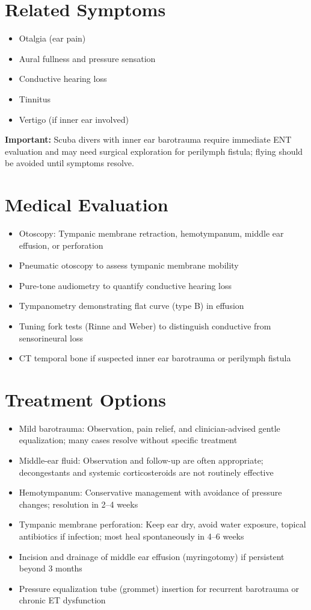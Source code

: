 \section*{Related Symptoms}
\begin{itemize}
  \item Otalgia (ear pain)
  \item Aural fullness and pressure sensation
  \item Conductive hearing loss
  \item Tinnitus
  \item Vertigo (if inner ear involved)
\end{itemize}
\textbf{Important:} Scuba divers with inner ear barotrauma require immediate ENT evaluation and may need surgical exploration for perilymph fistula; flying should be avoided until symptoms resolve.

\section*{Medical Evaluation}
\begin{itemize}
  \item Otoscopy: Tympanic membrane retraction, hemotympanum, middle ear effusion, or perforation
  \item Pneumatic otoscopy to assess tympanic membrane mobility
  \item Pure-tone audiometry to quantify conductive hearing loss
  \item Tympanometry demonstrating flat curve (type B) in effusion
  \item Tuning fork tests (Rinne and Weber) to distinguish conductive from sensorineural loss
  \item CT temporal bone if suspected inner ear barotrauma or perilymph fistula
\end{itemize}

\section*{Treatment Options}
\begin{itemize}
  \item Mild barotrauma: Observation, pain relief, and clinician-advised gentle equalization; many cases resolve without specific treatment
  \item Middle-ear fluid: Observation and follow-up are often appropriate; decongestants and systemic corticosteroids are not routinely effective
  \item Hemotympanum: Conservative management with avoidance of pressure changes; resolution in 2--4 weeks
  \item Tympanic membrane perforation: Keep ear dry, avoid water exposure, topical antibiotics if infection; most heal spontaneously in 4--6 weeks
  \item Incision and drainage of middle ear effusion (myringotomy) if persistent beyond 3 months
  \item Pressure equalization tube (grommet) insertion for recurrent barotrauma or chronic ET dysfunction
\end{itemize}

